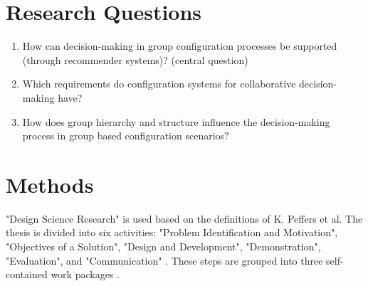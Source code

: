 \documentclass[a4paper]{IEEEtran}
\begin{document}
\section{Research Questions}

\begin{enumerate}
    \item How can decision-making in group configuration processes be supported (through recommender systems)? (central question)
    \item Which requirements do configuration systems for collaborative decision-making have?
    \item How does group hierarchy and structure influence the decision-making process in group based configuration scenarios?
\end{enumerate}

\section{Methods}

"Design Science Research" is used based on the definitions of K. Peffers et al. The thesis is divided into six activities: "Problem Identification and Motivation", "Objectives of a Solution", "Design and Development", "Demonstration", "Evaluation", and "Communication" \cite{peffersDesignScienceResearch2007}. 
These steps are grouped into three self-contained work packages \cite[p.~6]{offermannOutlineDesignScience2009}.




\printbibliography[heading=bibintoc]
\end{document}
